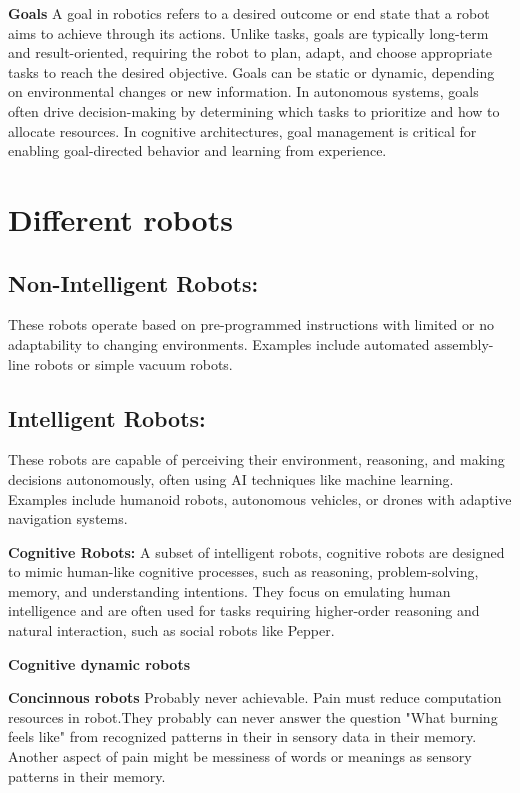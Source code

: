         \textbf{Goals} A goal in robotics refers to a desired outcome or end state that a robot aims to achieve through its actions. Unlike tasks, goals are typically long-term and result-oriented, requiring the robot to plan, adapt, and choose appropriate tasks to reach the desired objective. Goals can be static or dynamic, depending on environmental changes or new information. In autonomous systems, goals often drive decision-making by determining which tasks to prioritize and how to allocate resources. In cognitive architectures, goal management is critical for enabling goal-directed behavior and learning from experience.
        




\section{Different robots}

    \subsection{Non-Intelligent Robots:} These robots operate based on pre-programmed instructions with limited or no adaptability to changing environments. Examples include automated assembly-line robots or simple vacuum robots. 

    \subsection{Intelligent Robots:} These robots are capable of perceiving their environment, reasoning, and making decisions autonomously, often using AI techniques like machine learning. Examples include humanoid robots, autonomous vehicles, or drones with adaptive navigation systems. 

        \textbf{Cognitive Robots:} A subset of intelligent robots, cognitive robots are designed to mimic human-like cognitive processes, such as reasoning, problem-solving, memory, and understanding intentions. They focus on emulating human intelligence and are often used for tasks requiring higher-order reasoning and natural interaction, such as social robots like Pepper. 

        \textbf{Cognitive dynamic robots}

        \textbf{Concinnous robots}
        Probably never achievable. Pain must reduce computation resources in robot.They probably can never answer the question "What burning feels like" from recognized patterns in their in sensory data in their memory. Another aspect of pain might be messiness of words or meanings as sensory patterns in their memory.

